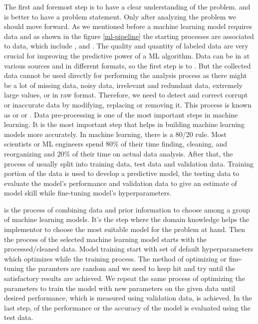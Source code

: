 \par
The first and foremost step is to have a clear understanding of the problem. and is better to have a problem statement. Only after analyzing the problem we should move forward. As we mentioned before a machine learning model requires data and as shown in the figure \ref{ml-pipeline} the starting processes are associated to data, which include ,  and . The quality and quantity of labeled data are very crucial for improving the predictive power of a ML algorithm. Data can be in at various sources and in different formats, so the first step is to . But the collected data cannot be used directly for performing the analysis process as there might be a lot of missing data, noisy data, irrelevant and redundant data, extremely large values, or in raw format. Therefore, we need to detect and correct corrupt or inaccurate data by modifying, replacing or removing it. This process is known as  or  or . Data pre-processing is one of the most important steps in machine learning. It is the most important step that helps in building machine learning models more accurately. In machine learning, there is a 80/20 rule. Most scientists or ML engineers spend 80\% of their time finding, cleaning, and reorganizing and 20\% of their time on actual data analysis. After that, the process of  usually split into training data, test data and validation data. Training portion of the data is used to develop a predictive model, the testing data to evaluate the model's performance and validation data to give an estimate of model skill while fine-tuning model's hyperparameters.
\newline
\par
{} is the process of combining data and prior information to choose among a group of machine learning models. It's the step where the domain knowledge helps the implementor to choose the most suitable model for the problem at hand. Then the process of  the selected machine learning model starts with the processed/cleaned data. Model training start with set of default hyperparameters which optimizes while the training process. The method of optimizing or fine-tuning the paramters are random and we need to keep hit and try until the satisfactory results are achieved. We repeat the same process of optimizing the parameters to train the model with new parameters on the given data until desired performance, which is measured using validation data, is achieved. In the last step, of  the performance or the accuracy of the model is evaluated using the test data.

